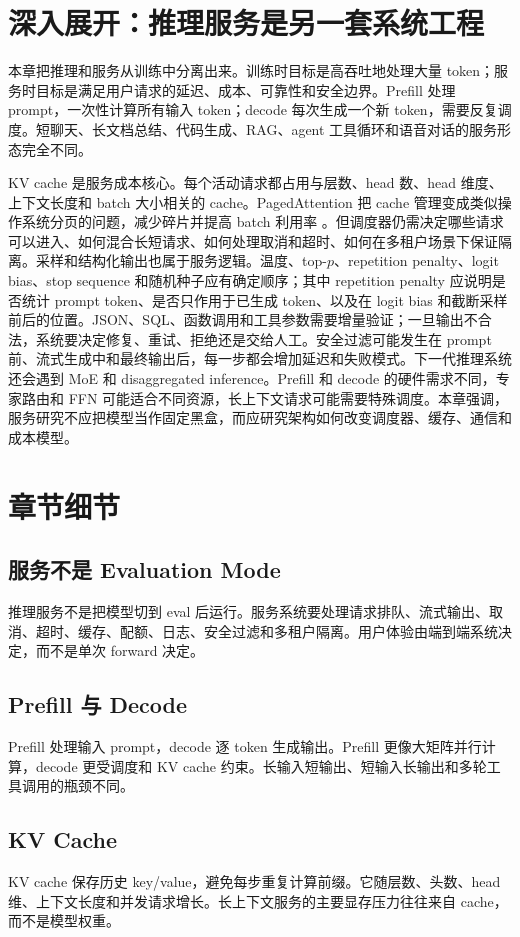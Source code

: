 \documentclass[UTF8,zihao=-4,openany]{ctexbook}
\begin{document}
\section{深入展开：推理服务是另一套系统工程}
本章把推理和服务从训练中分离出来。训练时目标是高吞吐地处理大量 token；服务时目标是满足用户请求的延迟、成本、可靠性和安全边界。Prefill 处理 prompt，一次性计算所有输入 token；decode 每次生成一个新 token，需要反复调度。短聊天、长文档总结、代码生成、RAG、agent 工具循环和语音对话的服务形态完全不同。

KV cache 是服务成本核心。每个活动请求都占用与层数、head 数、head 维度、上下文长度和 batch 大小相关的 cache。PagedAttention 把 cache 管理变成类似操作系统分页的问题，减少碎片并提高 batch 利用率 \cite{kwon2023efficient}。但调度器仍需决定哪些请求可以进入、如何混合长短请求、如何处理取消和超时、如何在多租户场景下保证隔离。采样和结构化输出也属于服务逻辑。温度、top-$p$、repetition penalty、logit bias、stop sequence 和随机种子应有确定顺序；其中 repetition penalty 应说明是否统计 prompt token、是否只作用于已生成 token、以及在 logit bias 和截断采样前后的位置。JSON、SQL、函数调用和工具参数需要增量验证；一旦输出不合法，系统要决定修复、重试、拒绝还是交给人工。安全过滤可能发生在 prompt 前、流式生成中和最终输出后，每一步都会增加延迟和失败模式。下一代推理系统还会遇到 MoE 和 disaggregated inference。Prefill 和 decode 的硬件需求不同，专家路由和 FFN 可能适合不同资源，长上下文请求可能需要特殊调度。本章强调，服务研究不应把模型当作固定黑盒，而应研究架构如何改变调度器、缓存、通信和成本模型。

\section{章节细节}
\subsection{服务不是 Evaluation Mode}
推理服务不是把模型切到 eval 后运行。服务系统要处理请求排队、流式输出、取消、超时、缓存、配额、日志、安全过滤和多租户隔离。用户体验由端到端系统决定，而不是单次 forward 决定。

\subsection{Prefill 与 Decode}
Prefill 处理输入 prompt，decode 逐 token 生成输出。Prefill 更像大矩阵并行计算，decode 更受调度和 KV cache 约束。长输入短输出、短输入长输出和多轮工具调用的瓶颈不同。

\subsection{KV Cache}
KV cache 保存历史 key/value，避免每步重复计算前缀。它随层数、头数、head 维、上下文长度和并发请求增长。长上下文服务的主要显存压力往往来自 cache，而不是模型权重。
\end{document}
